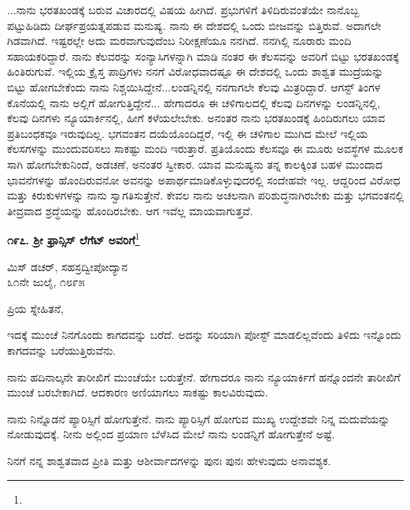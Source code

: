 ...ನಾನು ಭರತಖಂಡಕ್ಕೆ ಬರುವ ವಿಚಾರದಲ್ಲಿ ವಿಷಯ ಹೀಗಿದೆ. ಪ್ರಭುಗಳಿಗೆ ತಿಳಿದಿರುವಂತೆಯೇ ನಾನೊಬ್ಬ ಪಟ್ಟುಹಿಡಿದು ದೀರ್ಘಪ್ರಯತ್ನಪಡುವ ಮನುಷ್ಯ. ನಾನು ಈ ದೇಶದಲ್ಲಿ ಒಂದು ಬೀಜವನ್ನು ಬಿತ್ತಿರುವೆ. ಅದಾಗಲೇ ಗಿಡವಾಗಿದೆ. ಇಷ್ಟರಲ್ಲೇ ಅದು ಮರವಾಗುವುದೆಂಬ ನಿರೀಕ್ಷಣೆಯೂ ನನಗಿದೆ. ನನಗಿಲ್ಲಿ ನೂರಾರು ಮಂದಿ ಸಹಾಯಕರಿದ್ದಾರೆ. ನಾನು ಕೆಲವರನ್ನು ಸಂನ್ಯಾಸಿಗಳನ್ನಾಗಿ ಮಾಡಿ ನಂತರ ಈ ಕೆಲಸವನ್ನು ಅವರಿಗೆ ಬಿಟ್ಟು ಭರತಖಂಡಕ್ಕೆ ಹಿಂತಿರುಗುವೆ. ಇಲ್ಲಿಯ ಕ್ರೈಸ್ತ ಪಾದ್ರಿಗಳು ನನಗೆ ವಿರೋಧವಾದಷ್ಟೂ ಈ ದೇಶದಲ್ಲಿ ಒಂದು ಶಾಶ್ವತ ಮುದ್ರೆಯನ್ನು ಬಿಟ್ಟು ಹೋಗಬೇಕೆಂದು ನಾನು ನಿಶ್ಚಯಿಸಿದ್ದೇನೆ...ಲಂಡನ್ನಿನಲ್ಲಿ ನನಗಾಗಲೇ ಕೆಲವು ಮಿತ್ರರಿದ್ದಾರೆ. ಆಗಸ್ಟ್ ತಿಂಗಳ ಕೊನೆಯಲ್ಲಿ ನಾನು ಅಲ್ಲಿಗೆ ಹೋಗುತ್ತಿದ್ದೇನೆ... ಹೇಗಾದರೂ ಈ ಚಳಿಗಾಲದಲ್ಲಿ ಕೆಲವು ದಿನಗಳನ್ನು ಲಂಡನ್ನಿನಲ್ಲಿ, ಕೆಲವು ದಿನಗಳು ನ್ಯೂಯಾರ್ಕಿನಲ್ಲಿ, ಹೀಗೆ ಕಳೆಯಲೇಬೇಕು. ಅನಂತರ ನಾನು ಭರತಖಂಡಕ್ಕೆ ಹಿಂದಿರುಗಲು ಯಾವ ಪ್ರತಿಬಂಧಕವೂ ಇರುವುದಿಲ್ಲ. ಭಗವಂತನ ದಯೆಯೊಂದಿದ್ದರೆ, ಇಲ್ಲಿ ಈ ಚಳಿಗಾಲ ಮುಗಿದ ಮೇಲೆ ಇಲ್ಲಿಯ ಕೆಲಸಗಳನ್ನು ಮುಂದುವರಿಸಲು ಸಾಕಷ್ಟು ಮಂದಿ ಇರುತ್ತಾರೆ. ಪ್ರತಿಯೊಂದು ಕೆಲಸವೂ ಈ ಮೂರು ಅವಸ್ಥೆಗಳ ಮೂಲಕ ಸಾಗಿ ಹೋಗಬೇಕು\enginline{-}ನಿಂದೆ, ಅಡಚಣೆ, ಅನಂತರ ಸ್ವೀಕಾರ. ಯಾವ ಮನುಷ್ಯನು ತನ್ನ ಕಾಲಕ್ಕಿಂತ ಬಹಳ ಮುಂದಾದ ಭಾವನೆಗಳನ್ನು ಹೊಂದಿರುವನೋ ಅವನನ್ನು ಅಪಾರ್ಥಮಾಡಿಕೊಳ್ಳುವುದರಲ್ಲಿ ಸಂದೇಹವೇ ಇಲ್ಲ. ಆದ್ದರಿಂದ ವಿರೋಧ ಮತ್ತು ಕಿರುಕುಳಗಳನ್ನು ನಾನು ಸ್ವಾಗತಿಸುತ್ತೇನೆ. ಕೇವಲ ನಾನು ಅಚಲನಾಗಿ ಪರಿಶುದ್ಧನಾಗಿರಬೇಕು ಮತ್ತು ಭಗವಂತನಲ್ಲಿ ತೀವ್ರವಾದ ಶ್ರದ್ಧೆಯನ್ನು ಹೊಂದಿರಬೇಕು. ಆಗ ಇವೆಲ್ಲ ಮಾಯವಾಗುತ್ತವೆ.

\eject

\begin{center}
\textbf{೧೯೭. ಶ‍್ರೀ ಫ್ರಾನ್ಸಿಸ್ ಲೆಗೆಟ್ ಅವರಿಗೆ}\footnote{}
\end{center}

\vspace{-0.5cm}

\begin{flushright}
 ಮಿಸ್ ಡಚರ್‌, ಸಹಸ್ರದ್ವೀಪೋದ್ಯಾನ\\೩೧ನೇ ಜುಲೈ, ೧೮೯೫
\end{flushright}

\noindent
ಪ್ರಿಯ ಸ್ನೇಹಿತನೆ,

ಇದಕ್ಕೆ ಮುಂಚೆ ನಿನಗೊಂದು ಕಾಗದವನ್ನು ಬರೆದೆ. ಅದನ್ನು ಸರಿಯಾಗಿ ಪೋಸ್ಟ್ ಮಾಡಲಿಲ್ಲವೆಂದು ತಿಳಿದು ಇನ್ನೊಂದು ಕಾಗದವನ್ನು ಬರೆಯುತ್ತಿರುವೆನು.

ನಾನು ಹದಿನಾಲ್ಕನೇ ತಾರೀಖಿಗೆ ಮುಂಚೆಯೇ ಬರುತ್ತೇನೆ. ಹೇಗಾದರೂ ನಾನು ನ್ಯೂಯಾರ್ಕಿಗೆ ಹನ್ನೊಂದನೇ ತಾರೀಖಿಗೆ ಮುಂಚೆ ಬರಬೇಕಾಗಿದೆ. ಆದಕಾರಣ ಅಣಿಯಾಗಲು ಸಾಕಷ್ಟು ಕಾಲವಿರುವುದು.

ನಾನು ನಿನ್ನೊಡನೆ ಪ್ಯಾರಿಸ್ಸಿಗೆ ಹೋಗುತ್ತೇನೆ. ನಾನು ಪ್ಯಾರಿಸ್ಸಿಗೆ ಹೋಗುವ ಮುಖ್ಯ ಉದ್ದೇಶವೇ ನಿನ್ನ ಮದುವೆಯನ್ನು ನೋಡುವುದಕ್ಕೆ. ನೀನು ಅಲ್ಲಿಂದ ಪ್ರಯಾಣ ಬೆಳೆಸಿದ ಮೇಲೆ ನಾನು ಲಂಡನ್ನಿಗೆ ಹೋಗುತ್ತೇನೆ ಅಷ್ಟೆ.

ನಿನಗೆ ನನ್ನ ಶಾಶ್ವತವಾದ ಪ್ರೀತಿ ಮತ್ತು ಆಶೀರ್ವಾದಗಳನ್ನು ಪುನಃ ಪುನಃ ಹೇಳುವುದು ಅನಾವಶ್ಯಕ.

